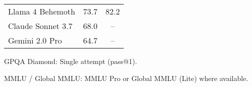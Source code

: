 \documentclass{scrartcl}
\begin{document}
\begin{table}[H]
\begin{threeparttable}
\begin{tabularx}{\textwidth}{@{} L T{2.1} T{2.1} @{}}
            Llama 4 Behemoth        & 73.7                  & 82.2                        \\
            Claude Sonnet 3.7       & 68.0                  &       \\
            Gemini 2.0 Pro          & 64.7                  &       \\
            \bottomrule
        \end{tabularx}
        \begin{tablenotes}
            \footnotesize
            \item GPQA Diamond: Single attempt (pass@1).
            \item MMLU / Global MMLU: MMLU Pro or Global MMLU (Lite) where available.
        \end{tablenotes}
    \end{threeparttable}
\end{table}
\end{document}
